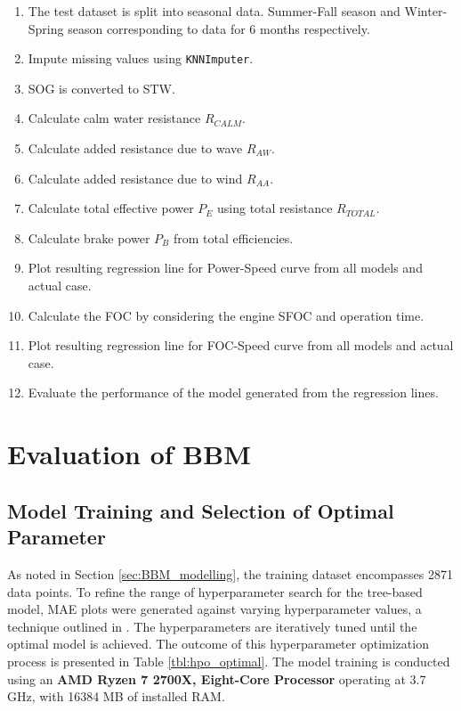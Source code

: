 \begin{enumerate}
    \setlength\itemsep{0em}
    \item The test dataset is split into seasonal data. Summer-Fall season and Winter-Spring season corresponding to data for 6 months respectively.
    \item Impute missing values using {\tt KNNImputer}.
    \item SOG is converted to STW.
    \item Calculate calm water resistance $R_{CALM}$.
    \item Calculate added resistance due to wave $R_{AW}$.
    \item Calculate added resistance due to wind $R_{AA}$.
    \item Calculate total effective power $P_E$ using total resistance $R_{TOTAL}$.
    \item Calculate brake power $P_B$ from total efficiencies.
    \item Plot resulting regression line for Power-Speed curve from all models and actual case. 
    \item Calculate the FOC by considering the engine SFOC and operation time.
    \item Plot resulting regression line for FOC-Speed curve from all models and actual case.
    \item Evaluate the performance of the model generated from the regression lines.
\end{enumerate}

\section{Evaluation of BBM}\label{sec:BBM_tree_evaluate}

\subsection{Model Training and Selection of Optimal Parameter}\label{sec:hpo_select_train}

As noted in Section \ref{sec:BBM_modelling}, the training dataset encompasses 2871 data points. To refine the range of hyperparameter search for the tree-based model, MAE plots were generated against varying hyperparameter values, a technique outlined in . The hyperparameters are iteratively tuned until the optimal model is achieved. The outcome of this hyperparameter optimization process is presented in Table \ref{tbl:hpo_optimal}. The model training is conducted using an \textbf{AMD Ryzen 7 2700X, Eight-Core Processor} operating at 3.7 GHz, with 16384 MB of installed RAM.\\

